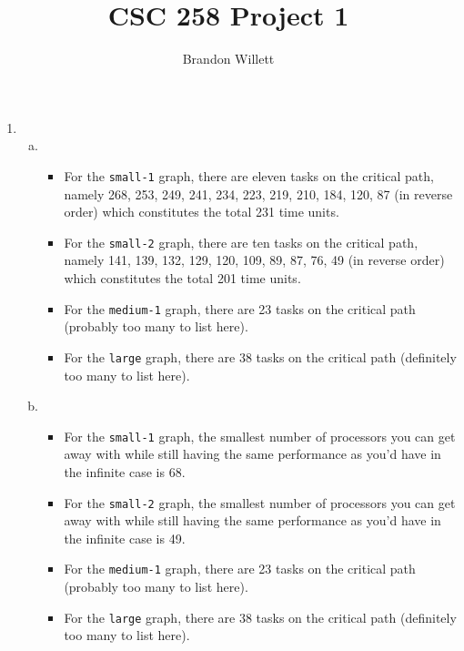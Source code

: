 \documentclass[letterpaper]{article}
\title{CSC 258 Project 1}
\author{Brandon Willett}
\begin{document}
	\maketitle

	\begin{enumerate}[1)]

		\item \begin{enumerate}[a)]

			\item \begin{itemize}

				\item For the \texttt{small-1} graph, there are eleven tasks on the critical path, namely 268, 253, 249, 241, 234, 223, 219, 210, 184, 120, 87 (in reverse order) which constitutes the total 231 time units.

				\item For the \texttt{small-2} graph, there are ten tasks on the critical path, namely 141, 139, 132, 129, 120, 109, 89, 87, 76, 49 (in reverse order) which constitutes the total 201 time units.

				\item For the \texttt{medium-1} graph, there are 23 tasks on the critical path (probably too many to list here).

				\item For the \texttt{large} graph, there are 38 tasks on the critical path (definitely too many to list here).

			\end{itemize}

			\item \begin{itemize}

				\item For the \texttt{small-1} graph, the smallest number of processors you can get away with while still having the same performance as you'd have in the infinite case is 68.

				\item For the \texttt{small-2} graph, the smallest number of processors you can get away with while still having the same performance as you'd have in the infinite case is 49.

				\item For the \texttt{medium-1} graph, there are 23 tasks on the critical path (probably too many to list here).

				\item For the \texttt{large} graph, there are 38 tasks on the critical path (definitely too many to list here).

			\end{itemize}

		\end{enumerate}

	\end{enumerate}
\end{document}

